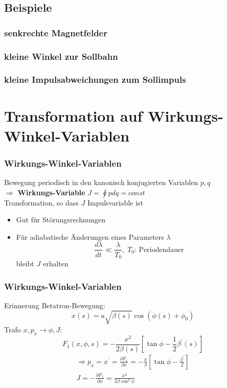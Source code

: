 \documentclass[hyperref={pdfpagelabels=false}]{beamer}
\begin{document}
\subsection{Beispiele}
\begin{frame}
\frametitle{senkrechte Magnetfelder}
 \pause

\end{frame}

\begin{frame}
 \frametitle{kleine Winkel zur Sollbahn}
\end{frame}

\begin{frame}
 \frametitle{kleine Impulsabweichungen zum Sollimpuls}
\end{frame}


\section{Transformation auf Wirkungs-Winkel-Variablen}
\begin{frame}
\frametitle{Wirkungs-Winkel-Variablen}
Bewegung periodisch in den kanonisch konjugierten Variablen $p,q$\\
$\Rightarrow$\textbf{ Wirkungs-Variable} $J = \oint p dq = const$\\
\vspace*{.7cm}\pause
Transformation, so dass $J$ Impulsvariable ist \begin{itemize}\item Gut für Störungsrechnungen  \item Für adiabatische Änderungen eines Parameters $\lambda$
\begin{equation*}
\frac{d\lambda }{dt} \ll \frac{\lambda}{T_0},\; T_0\text{: Periodendauer}
\end{equation*}
bleibt $J$ erhalten
\end{itemize}
\end{frame}
\begin{frame}
\frametitle{Wirkungs-Winkel-Variablen}
Erinnerung Betatron-Bewegung:
\begin{equation*}
x(s) = a \sqrt{\beta(s)} \cos (\phi(s) + \phi_0)
\end{equation*}
\pause
Trafo $x,p_x\rightarrow \phi,J$:
\begin{equation*}
F_1(x,\phi,s) = -\frac{x^2}{2\beta(s)}\left[ \tan \phi - \frac{1}{2}\beta^\prime(s)\right]
\end{equation*}\pause
\begin{gather*}\Rightarrow p_x = x^\prime = \frac{\partial F_1}{\partial x} = -\frac{x}{\beta}\left[\tan \phi - \frac{\beta^\prime}{2}\right]\\
J = - \frac{\partial F_1}{\partial \phi} = \frac{x^2}{2\beta\cos^2\psi}
\end{gather*}
\end{frame}
\end{document}
